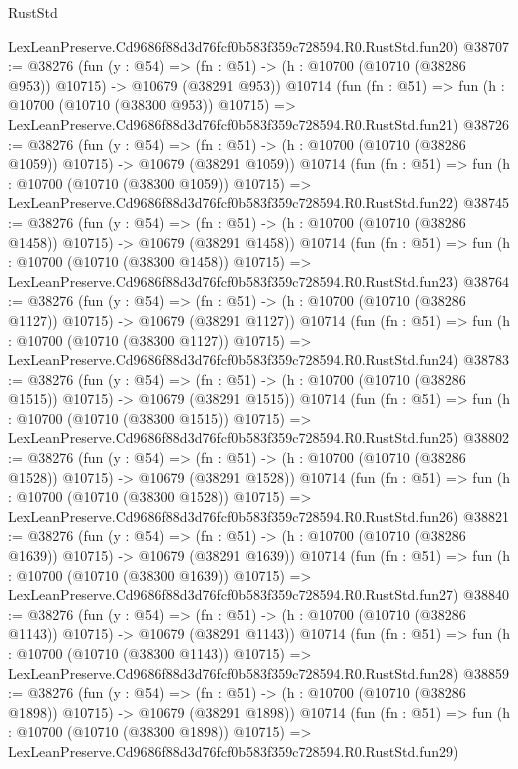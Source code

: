 \begin{lexlean}{RustStd}
\begin{coremodule}
    LexLeanPreserve.Cd9686f88d3d76fcf0b583f359c728594.R0.RustStd.fun20)
@38707 := @38276
    (fun (y : @54) =>
    (fn : @51) -> (h : @10700 (@10710 (@38286 @953)) @10715) -> @10679 (@38291 @953))
    @10714
    (fun (fn : @51) =>
    fun (h : @10700 (@10710 (@38300 @953)) @10715) =>
    LexLeanPreserve.Cd9686f88d3d76fcf0b583f359c728594.R0.RustStd.fun21)
@38726 := @38276
    (fun (y : @54) =>
    (fn : @51) -> (h : @10700 (@10710 (@38286 @1059)) @10715) -> @10679 (@38291 @1059))
    @10714
    (fun (fn : @51) =>
    fun (h : @10700 (@10710 (@38300 @1059)) @10715) =>
    LexLeanPreserve.Cd9686f88d3d76fcf0b583f359c728594.R0.RustStd.fun22)
@38745 := @38276
    (fun (y : @54) =>
    (fn : @51) -> (h : @10700 (@10710 (@38286 @1458)) @10715) -> @10679 (@38291 @1458))
    @10714
    (fun (fn : @51) =>
    fun (h : @10700 (@10710 (@38300 @1458)) @10715) =>
    LexLeanPreserve.Cd9686f88d3d76fcf0b583f359c728594.R0.RustStd.fun23)
@38764 := @38276
    (fun (y : @54) =>
    (fn : @51) -> (h : @10700 (@10710 (@38286 @1127)) @10715) -> @10679 (@38291 @1127))
    @10714
    (fun (fn : @51) =>
    fun (h : @10700 (@10710 (@38300 @1127)) @10715) =>
    LexLeanPreserve.Cd9686f88d3d76fcf0b583f359c728594.R0.RustStd.fun24)
@38783 := @38276
    (fun (y : @54) =>
    (fn : @51) -> (h : @10700 (@10710 (@38286 @1515)) @10715) -> @10679 (@38291 @1515))
    @10714
    (fun (fn : @51) =>
    fun (h : @10700 (@10710 (@38300 @1515)) @10715) =>
    LexLeanPreserve.Cd9686f88d3d76fcf0b583f359c728594.R0.RustStd.fun25)
@38802 := @38276
    (fun (y : @54) =>
    (fn : @51) -> (h : @10700 (@10710 (@38286 @1528)) @10715) -> @10679 (@38291 @1528))
    @10714
    (fun (fn : @51) =>
    fun (h : @10700 (@10710 (@38300 @1528)) @10715) =>
    LexLeanPreserve.Cd9686f88d3d76fcf0b583f359c728594.R0.RustStd.fun26)
@38821 := @38276
    (fun (y : @54) =>
    (fn : @51) -> (h : @10700 (@10710 (@38286 @1639)) @10715) -> @10679 (@38291 @1639))
    @10714
    (fun (fn : @51) =>
    fun (h : @10700 (@10710 (@38300 @1639)) @10715) =>
    LexLeanPreserve.Cd9686f88d3d76fcf0b583f359c728594.R0.RustStd.fun27)
@38840 := @38276
    (fun (y : @54) =>
    (fn : @51) -> (h : @10700 (@10710 (@38286 @1143)) @10715) -> @10679 (@38291 @1143))
    @10714
    (fun (fn : @51) =>
    fun (h : @10700 (@10710 (@38300 @1143)) @10715) =>
    LexLeanPreserve.Cd9686f88d3d76fcf0b583f359c728594.R0.RustStd.fun28)
@38859 := @38276
    (fun (y : @54) =>
    (fn : @51) -> (h : @10700 (@10710 (@38286 @1898)) @10715) -> @10679 (@38291 @1898))
    @10714
    (fun (fn : @51) =>
    fun (h : @10700 (@10710 (@38300 @1898)) @10715) =>
    LexLeanPreserve.Cd9686f88d3d76fcf0b583f359c728594.R0.RustStd.fun29)

\end{coremodule}
\end{lexlean}
